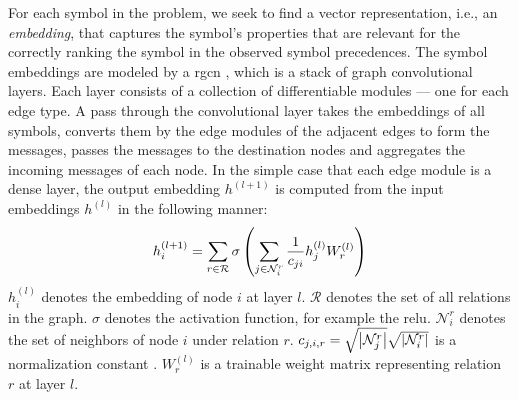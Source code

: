 For each symbol in the problem,
we seek to find a vector representation, i.e., an \emph{embedding},
that captures the symbol's properties that are relevant
for the correctly ranking the symbol in the observed symbol precedences.
The symbol embeddings are modeled by a \gls{rgcn} \cite{Schlichtkrull2017},
which is a stack of graph convolutional layers.
Each layer consists of a collection of differentiable modules --- one for each edge type.
A pass through the convolutional layer takes the embeddings of all symbols,
converts them by the edge modules of the adjacent edges to form the messages,
passes the messages to the destination nodes
and aggregates the incoming messages of each node.
In the simple case that each edge module is a dense layer,
the output embedding $h^{(l+1)}$ is computed from the input embeddings $h^{(l)}$ in the following manner:
$$
h_i^{(l+1)} =
\sum_{r \in \mathcal{R}} \sigma \left(\sum_{j \in \mathcal{N}_i^r} \frac{1}{c_{ji}} h_j^{(l)} W_r^{(l)}\right)
$$
$h_i^{(l)}$ denotes the embedding of node $i$ at layer $l$.
$\mathcal{R}$ denotes the set of all relations in the graph.
$\sigma$ denotes the activation function, for example the \gls{relu}.
$\mathcal{N}_i^r$ denotes the set of neighbors of node $i$ under relation $r$.
$c_{j, i, r} = \sqrt{\left|\mathcal{N}_j^r\right|} \sqrt{\left|\mathcal{N}_i^r\right|}$ is a normalization constant \cite{kipf2017semisupervised}.
$W_r^{(l)}$ is a trainable weight matrix representing relation $r$ at layer $l$.


